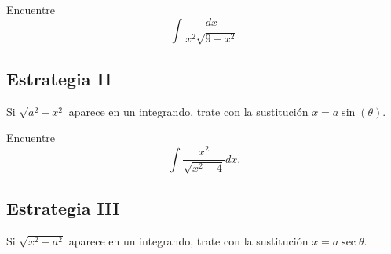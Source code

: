 \begin{resuelto}
 \label{ayr:exmp:32.12}
 Encuentre $$
 \displaystyle \int \dfrac{dx}{x^{2}\sqrt{9-x^{2}}}
 $$
\end{resuelto}



\subsection{Estrategia II}

 Si $\sqrt{a^{2}-x^{2}}$ aparece en un integrando, trate con la sustituci\'on $x=a\sin(\theta).$





\begin{resuelto}
\label{ayr:exmp:32.13}
Encuentre
$$
\displaystyle \int \dfrac{x^{2}}{\sqrt{x^{2}-4}}dx.
$$
\end{resuelto}



\subsection{Estrategia III}
  Si $\sqrt{x^{2}-a^{2}}$ aparece en un integrando, trate con la sustituci\'on $x=a\sec{\theta}.$


